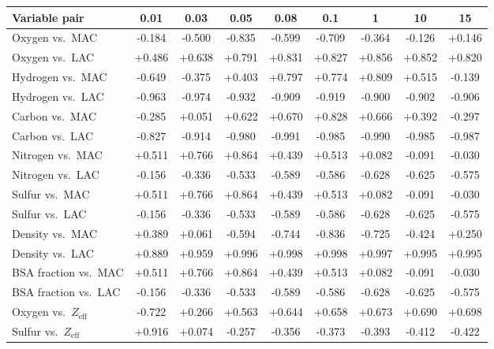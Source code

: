 \begin{tabular}{lcccccccc}
\toprule
Variable pair & 0.01 & 0.03 & 0.05 & 0.08 & 0.1 & 1 & 10 & 15 \\
\midrule
Oxygen vs.\ MAC & -0.184 & -0.500 & -0.835 & -0.599 & -0.709 & -0.364 & -0.126 & +0.146 \\
Oxygen vs.\ LAC & +0.486 & +0.638 & +0.791 & +0.831 & +0.827 & +0.856 & +0.852 & +0.820 \\
Hydrogen vs.\ MAC & -0.649 & -0.375 & +0.403 & +0.797 & +0.774 & +0.809 & +0.515 & -0.139 \\
Hydrogen vs.\ LAC & -0.963 & -0.974 & -0.932 & -0.909 & -0.919 & -0.900 & -0.902 & -0.906 \\
Carbon vs.\ MAC & -0.285 & +0.051 & +0.622 & +0.670 & +0.828 & +0.666 & +0.392 & -0.297 \\
Carbon vs.\ LAC & -0.827 & -0.914 & -0.980 & -0.991 & -0.985 & -0.990 & -0.985 & -0.987 \\
Nitrogen vs.\ MAC & +0.511 & +0.766 & +0.864 & +0.439 & +0.513 & +0.082 & -0.091 & -0.030 \\
Nitrogen vs.\ LAC & -0.156 & -0.336 & -0.533 & -0.589 & -0.586 & -0.628 & -0.625 & -0.575 \\
Sulfur vs.\ MAC & +0.511 & +0.766 & +0.864 & +0.439 & +0.513 & +0.082 & -0.091 & -0.030 \\
Sulfur vs.\ LAC & -0.156 & -0.336 & -0.533 & -0.589 & -0.586 & -0.628 & -0.625 & -0.575 \\
Density vs.\ MAC & +0.389 & +0.061 & -0.594 & -0.744 & -0.836 & -0.725 & -0.424 & +0.250 \\
Density vs.\ LAC & +0.889 & +0.959 & +0.996 & +0.998 & +0.998 & +0.997 & +0.995 & +0.995 \\
BSA fraction vs.\ MAC & +0.511 & +0.766 & +0.864 & +0.439 & +0.513 & +0.082 & -0.091 & -0.030 \\
BSA fraction vs.\ LAC & -0.156 & -0.336 & -0.533 & -0.589 & -0.586 & -0.628 & -0.625 & -0.575 \\
Oxygen vs.\ $Z_\mathrm{eff}$ & -0.722 & +0.266 & +0.563 & +0.644 & +0.658 & +0.673 & +0.690 & +0.698 \\
Sulfur vs.\ $Z_\mathrm{eff}$ & +0.916 & +0.074 & -0.257 & -0.356 & -0.373 & -0.393 & -0.412 & -0.422 \\
\bottomrule
\end{tabular}
